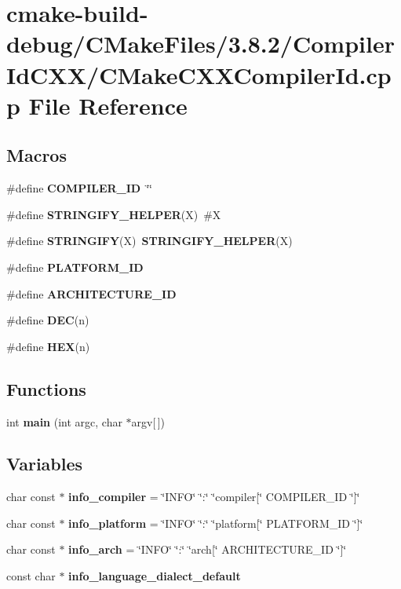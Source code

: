 \section{cmake-\/build-\/debug/\+C\+Make\+Files/3.8.2/\+Compiler\+Id\+C\+X\+X/\+C\+Make\+C\+X\+X\+Compiler\+Id.cpp File Reference}
\label{_c_make_c_x_x_compiler_id_8cpp}
\subsection*{Macros}
\begin{DoxyCompactItemize}
\item 
\#define {\bf C\+O\+M\+P\+I\+L\+E\+R\+\_\+\+ID}~\char`\"{}\char`\"{}
\item 
\#define {\bf S\+T\+R\+I\+N\+G\+I\+F\+Y\+\_\+\+H\+E\+L\+P\+ER}(X)~\#X
\item 
\#define {\bf S\+T\+R\+I\+N\+G\+I\+FY}(X)~{\bf S\+T\+R\+I\+N\+G\+I\+F\+Y\+\_\+\+H\+E\+L\+P\+ER}(X)
\item 
\#define {\bf P\+L\+A\+T\+F\+O\+R\+M\+\_\+\+ID}
\item 
\#define {\bf A\+R\+C\+H\+I\+T\+E\+C\+T\+U\+R\+E\+\_\+\+ID}
\item 
\#define {\bf D\+EC}(n)
\item 
\#define {\bf H\+EX}(n)
\end{DoxyCompactItemize}
\subsection*{Functions}
\begin{DoxyCompactItemize}
\item 
int {\bf main} (int argc, char $\ast$argv[$\,$])
\end{DoxyCompactItemize}
\subsection*{Variables}
\begin{DoxyCompactItemize}
\item 
char const $\ast$ {\bf info\+\_\+compiler} = \char`\"{}I\+N\+FO\char`\"{} \char`\"{}\+:\char`\"{} \char`\"{}compiler[\char`\"{} C\+O\+M\+P\+I\+L\+E\+R\+\_\+\+ID \char`\"{}]\char`\"{}
\item 
char const $\ast$ {\bf info\+\_\+platform} = \char`\"{}I\+N\+FO\char`\"{} \char`\"{}\+:\char`\"{} \char`\"{}platform[\char`\"{} P\+L\+A\+T\+F\+O\+R\+M\+\_\+\+ID \char`\"{}]\char`\"{}
\item 
char const $\ast$ {\bf info\+\_\+arch} = \char`\"{}I\+N\+FO\char`\"{} \char`\"{}\+:\char`\"{} \char`\"{}arch[\char`\"{} A\+R\+C\+H\+I\+T\+E\+C\+T\+U\+R\+E\+\_\+\+ID \char`\"{}]\char`\"{}
\item 
const char $\ast$ {\bf info\+\_\+language\+\_\+dialect\+\_\+default}
\end{DoxyCompactItemize}


